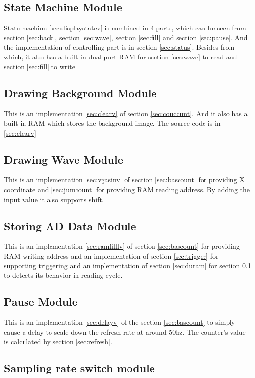 \documentclass[11pt]{scrartcl}
\begin{document}
\subsection{State Machine Module}
\label{sec:statusm}
State machine \ref{sec:displaystatev} is combined in 4 parts, which can be seen from section \ref{sec:back}, section \ref{sec:wave}, section \ref{sec:fill} and section \ref{sec:pause}. And the implementation of controlling part is in section \ref{sec:status}. Besides from which, it also has a built in dual port RAM for section \ref{sec:wave} to read and section \ref{sec:fill} to write.
\subsection{Drawing Background Module}
This is an implementation \ref{sec:clearv} of section \ref{sec:coucount}. And it also has a built in RAM which stores the background image. The source code is in \ref{sec:clearv}
\label{sec:back}

\subsection{Drawing Wave Module}
This is an implementation \ref{sec:vgasinv} of section \ref{sec:bascount} for providing X coordinate and \ref{sec:jumcount} for providing RAM reading address. By adding the input value it also supports shift.
\label{sec:wave}

\subsection{Storing AD Data Module}
This is an implementation \ref{sec:ramfilllv} of section \ref{sec:bascount} for providing RAM writing address and an implementation of section \ref{sec:trigger} for supporting triggering and an implementation of section \ref{sec:duram} for section \ref{sec:statusm} to detects its behavior in reading cycle.
\label{sec:fill}

\subsection{Pause Module}
This is an implementation \ref{sec:delayv} of the section \ref{sec:bascount} to simply cause a delay to scale down the refresh rate at around 50hz. The counter's value is calculated by section \ref{sec:refresh}.
\label{sec:pause}

\subsection{Sampling rate switch module}
\end{document}
